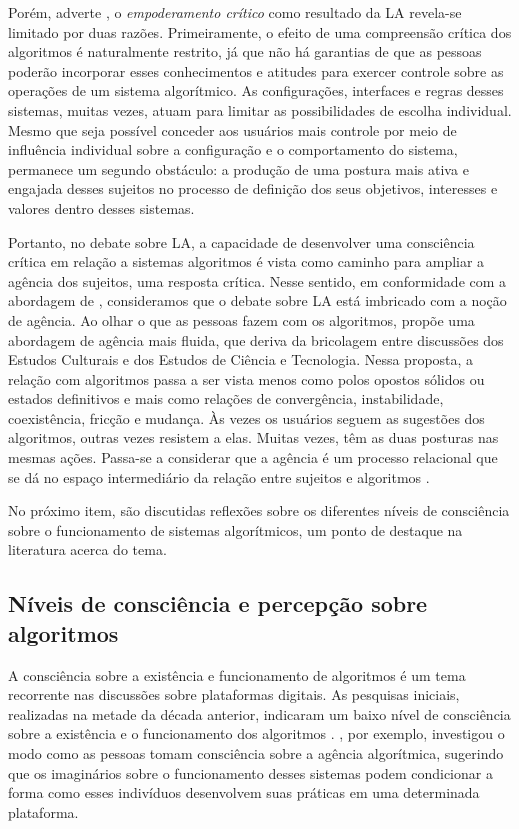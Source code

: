 Porém, adverte \textcite{Konig2022}, o \emph{empoderamento crítico} como
resultado da LA revela-se limitado por duas razões. Primeiramente, o
efeito de uma compreensão crítica dos algoritmos é naturalmente
restrito, já que não há garantias de que as pessoas poderão incorporar
esses conhecimentos e atitudes para exercer controle sobre as operações
de um sistema algorítmico. As configurações, interfaces e regras desses
sistemas, muitas vezes, atuam para limitar as possibilidades de escolha
individual. Mesmo que seja possível conceder aos usuários mais controle
por meio de influência individual sobre a configuração e o comportamento
do sistema, permanece um segundo obstáculo: a produção de uma postura
mais ativa e engajada desses sujeitos no processo de definição dos seus
objetivos, interesses e valores dentro desses sistemas.

Portanto, no debate sobre LA, a capacidade de desenvolver uma
consciência crítica em relação a sistemas algoritmos é vista como
caminho para ampliar a agência dos sujeitos, uma resposta crítica. Nesse
sentido, em conformidade com a abordagem de \textcite{Siles2024}, consideramos
que o debate sobre LA está imbricado com a noção de agência. Ao olhar o
que as pessoas fazem com os algoritmos, \textcite{Siles2024} propõe uma
abordagem de agência mais fluida, que deriva da bricolagem entre
discussões dos Estudos Culturais e dos Estudos de Ciência e Tecnologia.
Nessa proposta, a relação com algoritmos passa a ser vista menos como
polos opostos sólidos ou estados definitivos e mais como relações de
convergência, instabilidade, coexistência, fricção e mudança. Às vezes
os usuários seguem as sugestões dos algoritmos, outras vezes resistem a
elas. Muitas vezes, têm as duas posturas nas mesmas ações. Passa-se a
considerar que a agência é um processo relacional que se dá no espaço
intermediário da relação entre sujeitos e algoritmos \cite{Siles2024}.

No próximo item, são discutidas reflexões sobre os diferentes níveis de
consciência sobre o funcionamento de sistemas algorítmicos, um ponto de
destaque na literatura acerca do tema.

\subsection{Níveis de consciência e percepção sobre algoritmos}\label{sub-sec-niveisdeconscienciaepercepção}

A consciência sobre a existência e funcionamento de algoritmos é um tema
recorrente nas discussões sobre plataformas digitais. As pesquisas
iniciais, realizadas na metade da década anterior, indicaram um baixo
nível de consciência sobre a existência e o funcionamento dos algoritmos
\cite{Eslami2015}. \textcite{Bucher2019}, por exemplo, investigou o
modo como as pessoas tomam consciência sobre a agência algorítmica,
sugerindo que os imaginários sobre o funcionamento desses sistemas podem
condicionar a forma como esses indivíduos desenvolvem suas práticas em
uma determinada plataforma.

